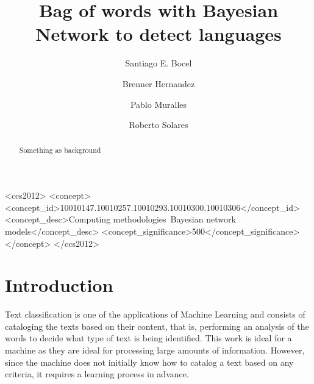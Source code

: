 \documentclass[format=sigconf, review=false, natbib=false]{acmart}
\begin{document}
\title{Bag of words with Bayesian Network to detect languages}


\author{Santiago E. Bocel}

\author{Brenner Hernandez}

\author{Pablo Muralles}

\author{Roberto Solares}

\begin{abstract}

Something as background

\end{abstract}

\begin{CCSXML}
<ccs2012>
    <concept>
        <concept_id>10010147.10010257.10010293.10010300.10010306</concept_id>
        <concept_desc>Computing methodologies~Bayesian network models</concept_desc>
        <concept_significance>500</concept_significance>
    </concept>
</ccs2012>
\end{CCSXML}



\maketitle

\section{Introduction}

Text classification is one of the applications of Machine Learning and consists of cataloging the texts based on their content, that is, performing an analysis of the words to decide what type of text is being identified.
\newline
\newline
This work is ideal for a machine as they are ideal for processing large amounts of information. However, since the machine does not initially know how to catalog a text based on any criteria, it requires a learning process in advance.
\newline

\nocite{*}
\printbibliography
\end{document}

